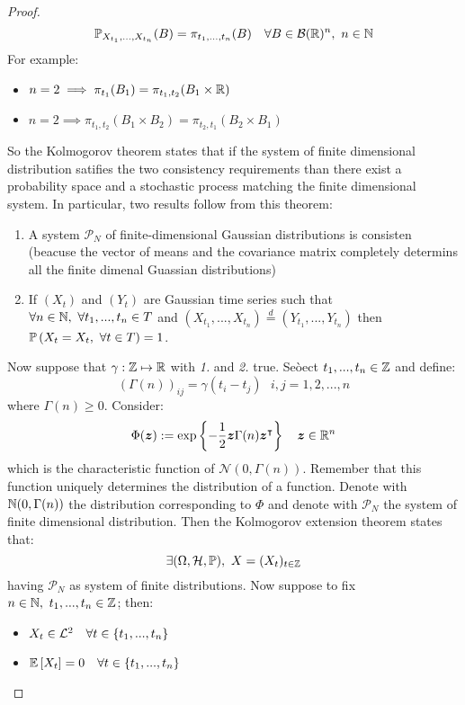 \begin{proof}
    \[
        \mathbb{P}_{X_{t_1},...,X_{t_n}}(B)=\pi_{t_1,...,t_n}(B)\ \ \ \forall B\in\mathcal{B}(\R)^n,\ n\in\N  
    \]
    For example:
    \begin{itemize}
        \item $n=2 \implies \pi_{t_1}(B_1)=\pi_{t_1,t_2}(B_1\times\mathbb{R})$
        \item $n=2 \implies \pi_{t_1,t_2}(B_1\times B_2)=\pi_{t_2,t_1}(B_2\times B_1)$
    \end{itemize}
    So the Kolmogorov theorem states that if the system of finite dimensional distribution satifies the two consistency requirements than there exist a probability space and a stochastic process matching the finite dimensional system. In particular, two results follow from this theorem:
    \begin{enumerate}
        \item A system $\mathcal{P}_N$ of finite-dimensional Gaussian distributions is consisten (beacuse the vector of means and the covariance matrix completely determins all the finite dimenal Guassian distributions)
        \item If $(X_t)$ and $(Y_t)$ are Gaussian time series such that $\forall n\in\mathbb{N},\ \forall t_1,...,t_n\in T$ and $(X_{t_1},...,X_{t_n})\stackrel{d}{=}(Y_{t_1},...,Y_{t_n})$ then $\mathbb{P}\left(X_t=X_t,\ \forall t\in T\right)=1$.
    \end{enumerate} 
    Now suppose that $\gamma:\mathbb{Z}\mapsto\mathbb{R}$ with \textit{1.} and \textit{2.} true. Seòect $t_1,...,t_n\in\mathbb{Z}$ and define:
    \[
        (\Gamma(n))_{ij}=\gamma(t_i-t_j)\ \ \ i,j=1,2,...,n  
    \]
    where $\Gamma(n)\ge0$. Consider:
    \[
        \Phi(\boldsymbol{z}):=\exp\left\{-\frac{1}{2}\boldsymbol{z}\Gamma(n)\boldsymbol{z}^\intercal\right\}\ \ \ \boldsymbol{z}\in\R^n
    \]
    which is the characteristic function of $\mathcal{N}(0,\Gamma(n))$. Remember that this function uniquely determines the distribution of a function. Denote with $\mathbb{N}(0,\Gamma(n))$ the distribution corresponding to $\Phi$ and denote with $\mathcal{P}_N$ the system of finite dimensional distribution. Then the Kolmogorov extension theorem states that:
    \[
        \exists(\Omega,\mathcal{H},\mathbb{P}),\ X=(X_t)_{t\in\Z}  
    \]
    having $\mathcal{P}_N$ as system of finite distributions. Now suppose to fix $n\in\mathbb{N},\ t_1,...,t_n\in\mathbb{Z}$; then:
    \begin{itemize}
        \item $X_t\in\mathcal{L}^{2}\ \ \ \forall t\in\{t_1,...,t_n\}$
        \item $\mathbb{E}\left[X_t\right]=0\ \ \ \forall t\in\{t_1,...,t_n\}$

\end{itemize}
\end{proof}
